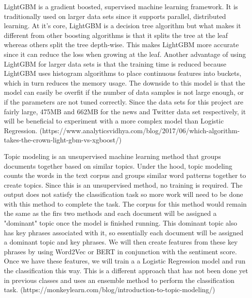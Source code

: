 \documentclass[conference]{IEEEtran}
\begin{document}
LightGBM is a gradient boosted, supervised machine learning framework. It is traditionally used on larger data sets since it supports parallel, distributed learning. At it's core, LightGBM is a decision tree algorithm but what makes it different from other boosting algorithms is that it splits the tree at the leaf whereas others split the tree depth-wise. This makes LightGBM more accurate since it can reduce the loss when growing at the leaf. Another advantage of using LightGBM for larger data sets is that the training time is reduced because LightGBM uses histogram algorithms to place continuous features into buckets, which in turn reduces the memory usage. The downside to this model is that the model can easily be overfit if the number of data samples is not large enough, or if the parameters are not tuned correctly. Since the data sets for this project are fairly large, 475MB and 662MB for the news and Twitter data set respectively, it will be beneficial to experiment with a more complex model than Logistic Regression. 
(https://www.analyticsvidhya.com/blog/2017/06/which-algorithm-takes-the-crown-light-gbm-vs-xgboost/)

Topic modeling is an unsupervised machine learning method that groups documents together based on similar topics. Under the hood, topic modeling counts the words in the text corpus and groups similar word patterns together to create topics. Since this is an unsupervised method, no training is required. The output does not satisfy the classification task so more work will need to be done with this method to complete the task. The corpus for this method would remain the same as the firs two methods and each document will be assigned a "dominant" topic once the model is finished running. This dominant topic also has key phrases associated with it, so essentially each document will be assigned a dominant topic and key phrases. We will then create features from these key phrases by using Word2Vec or BERT in conjunction with the sentiment score. Once we have these features, we will train a a Logistic Regression model and run the classification this way. This is a different approach that has not been done yet in previous classes and uses an ensemble method to perform the classification task. (https://monkeylearn.com/blog/introduction-to-topic-modeling/)
\end{document}
